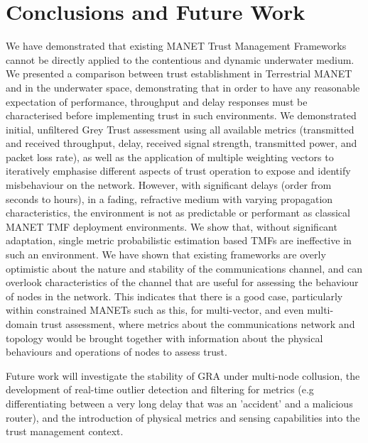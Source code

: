 \documentclass[conference]{IEEEtran}
\begin{document}
\section{Conclusions and Future Work}
We have demonstrated that existing MANET Trust Management Frameworks cannot be directly applied to the contentious and dynamic underwater medium.
We presented a comparison between trust establishment in Terrestrial MANET and in the underwater space, demonstrating that in order to have any reasonable expectation of performance, throughput and delay responses must be characterised before implementing trust in such environments. 
We demonstrated initial, unfiltered Grey Trust assessment using all available metrics (transmitted and received throughput, delay, received signal strength, transmitted power, and packet loss rate), as well as the application of multiple weighting vectors to iteratively emphasise different aspects of trust operation to expose and identify misbehaviour on the network.
However, with significant delays (order from seconds to hours), in a fading, refractive medium with varying propagation characteristics, the environment is not as predictable or performant as classical MANET TMF deployment environments.
We show that, without significant adaptation, single metric probabilistic estimation based TMFs are ineffective in such an environment.
We have shown that existing frameworks are overly optimistic about the nature and stability of the communications channel, and can overlook characteristics of the channel that are useful for assessing the behaviour of nodes in the network. 
This indicates that there is a good case, particularly within constrained MANETs such as this, for multi-vector, and even multi-domain trust assessment, where metrics about the communications network and topology would be brought together with information about the physical behaviours and operations of nodes to assess trust.

Future work will investigate the stability of GRA under multi-node collusion, the development of real-time outlier detection and filtering for metrics (e.g differentiating between a very long delay that was an 'accident' and a malicious router), and the introduction of physical metrics and sensing capabilities into the trust management context.
\end{document}
